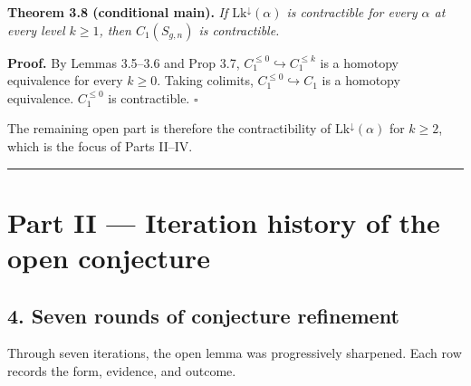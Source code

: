 \documentclass[
]{article}
\begin{document}
\textbf{Theorem 3.8 (conditional main).} \emph{If
\(\mathrm{Lk}^\downarrow(\alpha)\) is contractible for every \(\alpha\)
at every level \(k \ge 1\), then \(C_1(S_{g,n})\) is contractible.}

\textbf{Proof.} By Lemmas 3.5--3.6 and Prop 3.7,
\(C_1^{\le 0} \hookrightarrow C_1^{\le k}\) is a homotopy equivalence
for every \(k \ge 0\). Taking colimits,
\(C_1^{\le 0} \hookrightarrow C_1\) is a homotopy equivalence.
\(C_1^{\le 0}\) is contractible. \(\square\)

The remaining open part is therefore the contractibility of
\(\mathrm{Lk}^\downarrow(\alpha)\) for \(k \ge 2\), which is the focus
of Parts II--IV.

\begin{center}\rule{0.5\linewidth}{0.5pt}\end{center}

\section{Part II --- Iteration history of the open
conjecture}\label{part-ii-iteration-history-of-the-open-conjecture}

\subsection{4. Seven rounds of conjecture
refinement}\label{seven-rounds-of-conjecture-refinement}

Through seven iterations, the open lemma was progressively sharpened.
Each row records the form, evidence, and outcome.
\end{document}
